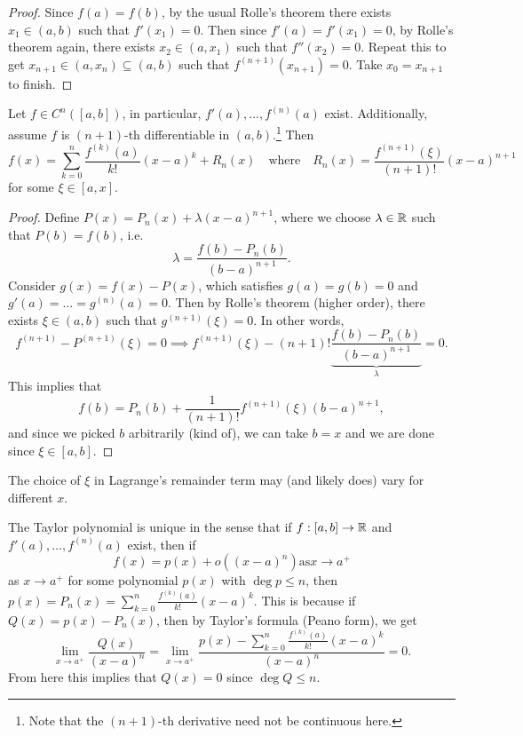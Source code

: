 \begin{proof}
  Since $f(a) = f(b)$, by the usual Rolle's theorem
  there exists $x_1 \in (a, b)$ such that $f'(x_1) = 0$.
  Then since $f'(a) = f'(x_1) = 0$, by
  Rolle's theorem again,
  there exists $x_2 \in (a, x_1)$ such that $f''(x_2) = 0$.
  Repeat this to get $x_{n + 1} \in (a, x_n) \subseteq (a, b)$ such that
  $f^{(n + 1)}(x_{n + 1}) = 0$. Take $x_0 = x_{n + 1}$
  to finish.
\end{proof}

\begin{theorem}
  Let $f \in C^n([a, b])$, in particular,
  $f'(a), \dots, f^{(n)}(a)$ exist. Additionally,
  assume $f$ is $(n + 1)$-th differentiable in $(a, b)$.\footnote{Note that the $(n + 1)$-th derivative need not be continuous here.}
  Then
  \[
    f(x) = \sum_{k = 0}^n \frac{f^{(k)}(a)}{k!}(x - a)^k + R_n(x) \quad \text{where} \quad R_n(x) = \frac{f^{(n + 1)}(\xi)}{(n + 1)!}(x - a)^{n + 1}
  \]
  for some $\xi \in [a, x]$.
\end{theorem}

\begin{proof}
  Define $P(x) = P_n(x) + \lambda (x - a)^{n + 1}$, where
  we choose $\lambda \in \mathbb{R}$ such that $P(b) = f(b)$, i.e.
  \[
    \lambda = \frac{f(b) - P_n(b)}{(b - a)^{n + 1}}.
  \]
  Consider $g(x)  = f(x) - P(x)$, which satisfies
  $g(a) = g(b) = 0$ and $g'(a) = \dots = g^{(n)}(a) = 0$.
  Then by Rolle's theorem (higher order), there exists
  $\xi \in (a, b)$ such that $g^{(n + 1)}(\xi) = 0$.
  In other words,
  \[
    f^{(n + 1)} - P^{(n + 1)}(\xi) = 0
    \implies f^{(n + 1)}(\xi) - (n + 1)! \underbrace{\frac{f(b) - P_n(b)}{(b - a)^{n + 1}}}_{\lambda} = 0.
  \]
  This implies that
  \[
    f(b) = P_n(b) + \frac{1}{(n + 1)!} f^{(n + 1)}(\xi) (b - a)^{n + 1},
  \]
  and since we picked $b$ arbitrarily (kind of),
  we can take $b = x$ and we are done since
  $\xi \in [a, b]$.
\end{proof}

\begin{remark}
  The choice of $\xi$ in Lagrange's remainder term
  may (and likely does) vary for different $x$.
\end{remark}

\begin{remark}
  The Taylor polynomial is unique in the sense that
  if $f : [a, b] \to \mathbb{R}$ and $f'(a), \dots, f^{(n)}(a)$
  exist, then if
  \[f(x) = p(x) + o((x - a)^n) \text{as} x \to a^+\]
  as $x \to a^+$ for some polynomial $p(x)$ with
  $\deg p \le n$, then
  $p(x) = P_n(x) = \sum_{k = 0}^n \frac{f^{(k)}(a)}{k!} (x - a)^k$.
  This is because if $Q(x) = p(x) - P_n(x)$, then
  by Taylor's formula (Peano form), we get
  \[
    \lim_{x \to a^+} \frac{Q(x)}{(x - a)^n}
    = \lim_{x \to a^+} \frac{p(x) - \sum_{k = 0}^n \frac{f^{(k)}(a)}{k!} (x - a)^k}{(x - a)^n} = 0.
  \]
  From here this implies that $Q(x) = 0$ since $\deg Q \le n$.
\end{remark}
